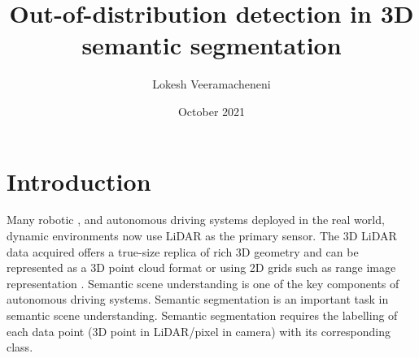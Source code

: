 \documentclass[thesis]{mas_proposal}
\title{Out-of-distribution detection in 3D semantic segmentation}
\author{Lokesh Veeramacheneni}
\date{October 2021}
\begin{document}
\maketitle

\pagestyle{plain}

\section{Introduction}
Many robotic \cite{thrun2006stanley} \cite{patz2008practical}, and autonomous driving systems \cite{li2016vehicle} deployed in the real world, dynamic environments now use LiDAR as the primary sensor.
The 3D LiDAR data acquired offers a true-size replica of rich 3D geometry and can be represented as a 3D point cloud format or using 2D grids such as range image representation \cite{Milioto2019}.
Semantic scene understanding is one of the key components of autonomous driving systems. 
Semantic segmentation is an important task in semantic scene understanding.
Semantic segmentation requires the labelling of each data point (3D point in LiDAR/pixel in camera) with its corresponding class.
\end{document}
